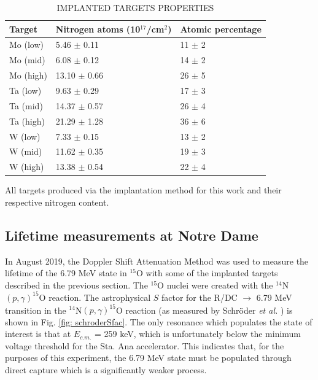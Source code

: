 \begin{table}[]
\caption{IMPLANTED TARGETS PROPERTIES}
\centering

\begin{threeparttable}
\begin{tabular}{@{}lll@{}}
\toprule
Target    & Nitrogen atoms (10$^{17}$/cm$^{2}$) & Atomic percentage \\ \midrule
Mo (low)  & 5.46 $\pm$ 0.11                     & 11 $\pm$ 2        \\
Mo (mid)  & 6.08 $\pm$ 0.12                     & 14 $\pm$ 2        \\
Mo (high) & 13.10 $\pm$ 0.66                    & 26 $\pm$ 5        \\
Ta (low)  & 9.63 $\pm$ 0.29                     & 17 $\pm$ 3        \\
Ta (mid)  & 14.37 $\pm$ 0.57                    & 26 $\pm$ 4        \\
Ta (high) & 21.29 $\pm$ 1.28                    & 36 $\pm$ 6        \\
W (low)   & 7.33 $\pm$ 0.15                     & 13 $\pm$ 2        \\
W (mid)   & 11.62 $\pm$ 0.35                    & 19 $\pm$ 3        \\
W (high)  & 13.38 $\pm$ 0.54                    & 22 $\pm$ 4        \\ \bottomrule
\end{tabular}
\begin{tablenotes}
\small
\item All targets produced via the implantation method for this work and their respective nitrogen content. 
\end{tablenotes}
\end{threeparttable}
\label{table: implantedTargets}
\end{table}



\subsection{Lifetime measurements at Notre Dame}
\label{sec: lifetimeND}

In August 2019, the Doppler Shift Attenuation Method was used to measure the lifetime of the 6.79 MeV state in $^{15}$O with some of the implanted targets described in the previous section. The $^{15}$O nuclei were created with the  $^{14}$N$\left( p,\gamma \right) ^{15}$O reaction. The astrophysical $S$ factor for the R/DC $\rightarrow$ 6.79 MeV transition in the $^{14}$N$\left( p,\gamma \right) ^{15}$O reaction (as measured by Schr{\"o}der \textit{et al.} \cite{Schroder1987}) is shown in Fig. \ref{fig: schroderSfac}. The only resonance which populates the state of interest is that at  $E_{c.m.}$ = 259 keV, which is unfortunately below the minimum voltage threshold for the Sta. Ana accelerator. This indicates that, for the purposes of this experiment, the 6.79 MeV state must be populated through direct capture which is a significantly weaker process. 

